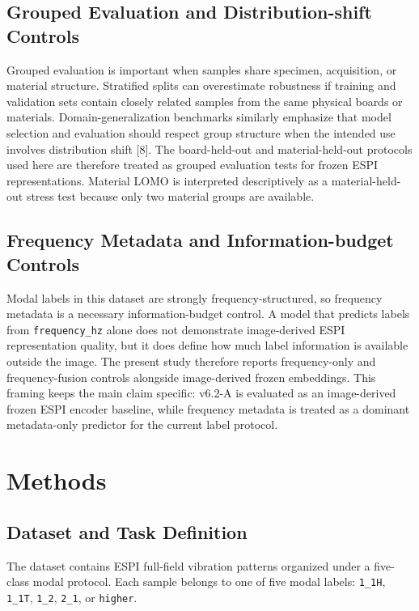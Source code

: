 \documentclass[review,3p,times]{elsarticle}
\begin{document}
\subsection{Grouped Evaluation and Distribution-shift Controls}
Grouped evaluation is important when samples share specimen, acquisition, or material structure. Stratified splits can overestimate robustness if training and validation sets contain closely related samples from the same physical boards or materials. Domain-generalization benchmarks similarly emphasize that model selection and evaluation should respect group structure when the intended use involves distribution shift [8]. The board-held-out and material-held-out protocols used here are therefore treated as grouped evaluation tests for frozen ESPI representations. Material LOMO is interpreted descriptively as a material-held-out stress test because only two material groups are available.

\subsection{Frequency Metadata and Information-budget Controls}
Modal labels in this dataset are strongly frequency-structured, so frequency metadata is a necessary information-budget control. A model that predicts labels from \texttt{frequency\_hz} alone does not demonstrate image-derived ESPI representation quality, but it does define how much label information is available outside the image. The present study therefore reports frequency-only and frequency-fusion controls alongside image-derived frozen embeddings. This framing keeps the main claim specific: v6.2-A is evaluated as an image-derived frozen ESPI encoder baseline, while frequency metadata is treated as a dominant metadata-only predictor for the current label protocol.

\section{Methods}
\label{sec:methods}

\subsection{Dataset and Task Definition}
The dataset contains ESPI full-field vibration patterns organized under a five-class modal protocol. Each sample belongs to one of five modal labels: \texttt{1\_1H}, \texttt{1\_1T}, \texttt{1\_2}, \texttt{2\_1}, or \texttt{higher}.
\end{document}
